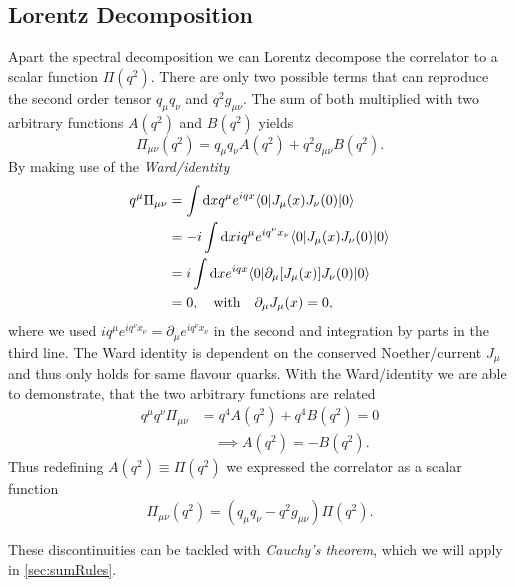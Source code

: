 \documentclass[../../index.tex]{subfiles}
\begin{document}
\subsection{Lorentz Decomposition}
Apart the spectral decomposition we can Lorentz decompose the correlator to a
scalar function $\Pi(q^2)$. There are only two possible terms that can reproduce
the second order tensor $q_\mu q_\nu$ and $q^2 g_{\mu\nu}$. The sum of both
multiplied with two arbitrary functions $A(q^2)$ and $B(q^2)$ yields
\begin{equation}
  \Pi_{\mu\nu}(q^2) = q_\mu q_\nu A(q^2) + q^2 g_{\mu\nu} B(q^2).
\end{equation}
By making use of the \textit{Ward\-/identity}
\begin{equation}
  \label{eq:wardIdentity}
  \begin{split}
    q^\mu \Pi_{\mu\nu} &= \int \dif x q^\mu e^{iqx} \langle 0 \vert  J_\mu(x) J_\nu(0) \vert 0 \rangle \\
    &= -i \int \dif x i q^\mu e^{i q^\nu x_\nu} \langle 0 \vert J_\mu(x) J_\nu(0) \vert 0 \rangle \\
    &= i \int \dif x e^{iqx} \langle 0 \vert \partial_\mu[J_\mu(x)] J_\nu(0)
    \vert 0 \rangle \\
    &= 0, \quad \text{with} \quad \partial_\mu J_\mu(x) = 0,
  \end{split}
\end{equation}
where we used $i q^\mu e^{i q^\nu x_\nu} = \partial_\mu e^{i q^\nu x_\nu}$ in
the second and integration by parts in the third line. The Ward identity is
dependent on the conserved Noether\-/current $J_\mu$ and thus only holds for
same flavour quarks. With the Ward\-/identity we are able to demonstrate, that
the two arbitrary functions are related
\begin{equation}
  \begin{split}
    q^\mu q^\nu \Pi_{\mu\nu} &= q^4 A(q^2) + q^4 B(q^2) = 0 \\
    &\quad \implies A(q^2) = -B(q^2).
  \end{split}
\end{equation}
Thus redefining $A(q^2) \equiv \Pi(q^2)$ we expressed the correlator as a scalar
function
\begin{equation}
  \Pi_{\mu\nu}(q^2) = (q_\mu q_\nu - q^2 g_{\mu\nu})\Pi(q^2).
\end{equation}





These discontinuities can be tackled with \textit{Cauchy's theorem}, which we
will apply in \cref{sec:sumRules}.
\end{document}
